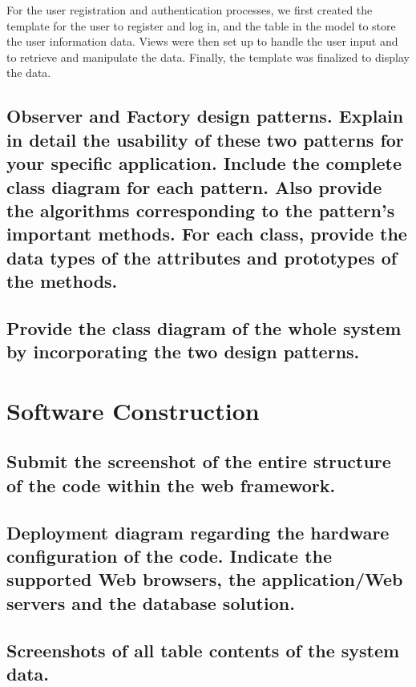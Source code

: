 \documentclass[letterpaper, 12 pt, conference]{ieeeconf}
\begin{document}
For the user registration and authentication processes, we first created the template for the user to register and log in, and the table in the model to store the user information data. Views were then set up to handle the user input and to retrieve and manipulate the data. Finally, the template was finalized to display the data.
\newpage
    
\subsection{Observer and Factory design patterns. Explain in detail the usability of these two patterns for your specific application. Include the complete class diagram for each pattern. Also provide the algorithms corresponding to the pattern’s important methods. For each class, provide the data types of the attributes and prototypes of the methods.}
\linebreak
    \hfill \break
    
\subsection{Provide the class diagram of the whole system by incorporating the two design patterns.}
\linebreak
    \hfill \break

\section{Software Construction}
\subsection{Submit the screenshot of the entire structure of the code within the web framework.}
\linebreak
    \hfill \break
    
\subsection{Deployment diagram regarding the hardware configuration of the code. Indicate the supported Web browsers, the application/Web servers and the database solution.}
\linebreak
    \hfill \break
    
\subsection{Screenshots of all table contents of the system data.}
\linebreak
    \hfill \break
    
\end{document}
